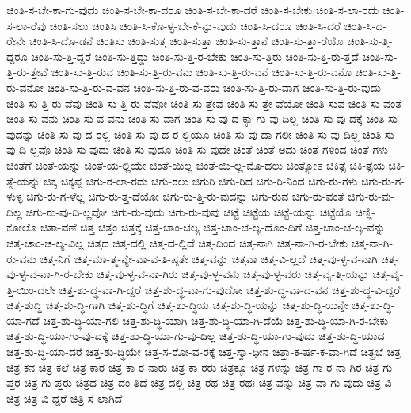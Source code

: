 {ಚಿಂತಿ-ಸ-ಬೇ-ಕಾ-ಗು-ವುದು
ಚಿಂತಿ-ಸ-ಬೇ-ಕಾ-ದರೂ
ಚಿಂತಿ-ಸ-ಬೇ-ಕಾ-ದರೆ
ಚಿಂತಿ-ಸ-ಬೇಕು
ಚಿಂತಿ-ಸ-ಲಾ-ರದು
ಚಿಂತಿ-ಸ-ಲಾ-ರೆವು
ಚಿಂತಿ-ಸಲು
ಚಿಂತಿಸಿ
ಚಿಂತಿ-ಸಿ-ಕೊ-ಳ್ಳ-ಬೇ-ಕೆ-ನ್ನು-ವುದು
ಚಿಂತಿ-ಸಿ-ದರೂ
ಚಿಂತಿ-ಸಿ-ದರೆ
ಚಿಂತಿ-ಸಿ-ದ-ರೇನೇ
ಚಿಂತಿ-ಸಿ-ದೊ-ಡನೆ
ಚಿಂತಿಸು
ಚಿಂತಿ-ಸುತ್ತ
ಚಿಂತಿ-ಸುತ್ತಾ
ಚಿಂತಿ-ಸು-ತ್ತಾನೆ
ಚಿಂತಿ-ಸು-ತ್ತಾ-ರೆಯೊ
ಚಿಂತಿ-ಸು-ತ್ತಿ-ದ್ದರೂ
ಚಿಂತಿ-ಸು-ತ್ತಿ-ದ್ದರೆ
ಚಿಂತಿ-ಸು-ತ್ತಿದ್ದು
ಚಿಂತಿ-ಸು-ತ್ತಿ-ರ-ಬೇಕು
ಚಿಂತಿ-ಸು-ತ್ತಿರು
ಚಿಂತಿ-ಸು-ತ್ತಿ-ರು-ತ್ತದೆ
ಚಿಂತಿ-ಸು-ತ್ತಿ-ರು-ತ್ತೇವೆ
ಚಿಂತಿ-ಸು-ತ್ತಿ-ರುವ
ಚಿಂತಿ-ಸು-ತ್ತಿ-ರು-ವನು
ಚಿಂತಿ-ಸು-ತ್ತಿ-ರು-ವನೆ
ಚಿಂತಿ-ಸು-ತ್ತಿ-ರು-ವನೊ
ಚಿಂತಿ-ಸು-ತ್ತಿ-ರು-ವನೋ
ಚಿಂತಿ-ಸು-ತ್ತಿ-ರು-ವ-ವನ
ಚಿಂತಿ-ಸು-ತ್ತಿ-ರು-ವ-ವರು
ಚಿಂತಿ-ಸು-ತ್ತಿ-ರು-ವಾಗ
ಚಿಂತಿ-ಸು-ತ್ತಿ-ರು-ವುದು
ಚಿಂತಿ-ಸು-ತ್ತಿ-ರು-ವೆವು
ಚಿಂತಿ-ಸು-ತ್ತಿ-ರು-ವೆವೋ
ಚಿಂತಿ-ಸು-ತ್ತೇವೆ
ಚಿಂತಿ-ಸು-ತ್ತೇ-ವೆಯೋ
ಚಿಂತಿ-ಸುವ
ಚಿಂತಿ-ಸು-ವಂತೆ
ಚಿಂತಿ-ಸು-ವನು
ಚಿಂತಿ-ಸು-ವ-ವನು
ಚಿಂತಿ-ಸು-ವಾಗ
ಚಿಂತಿ-ಸು-ವು-ದ-ಕ್ಕಾ-ಗು-ವು-ದಿಲ್ಲ
ಚಿಂತಿ-ಸು-ವು-ದಕ್ಕೆ
ಚಿಂತಿ-ಸು-ವುದನ್ನು
ಚಿಂತಿ-ಸು-ವು-ದ-ರಲ್ಲಿ
ಚಿಂತಿ-ಸು-ವು-ದ-ರ-ಲ್ಲಿಯೂ
ಚಿಂತಿ-ಸು-ವು-ದಾ-ಗಲೀ
ಚಿಂತಿ-ಸು-ವು-ದಿಲ್ಲ
ಚಿಂತಿ-ಸು-ವು-ದಿ-ಲ್ಲವೊ
ಚಿಂತಿ-ಸು-ವುದು
ಚಿಂತಿ-ಸು-ವುದೂ
ಚಿಂತಿ-ಸು-ವುದೇ
ಚಿಂತೆ
ಚಿಂತೆ-ಅದು
ಚಿಂತೆ-ಗಳಿಂದ
ಚಿಂತೆ-ಗಳು
ಚಿಂತೆಗೆ
ಚಿಂತೆ-ಯನ್ನು
ಚಿಂತೆ-ಯ-ಲ್ಲಿಯೇ
ಚಿಂತೆ-ಯಿಲ್ಲ
ಚಿಂತೆ-ಯಿ-ಲ್ಲ-ಮೊ-ದಲು
ಚಿಂತ್ಯೋಽ
ಚಿಕಿತ್ಸೆ
ಚಿಕಿ-ತ್ಸೆಯ
ಚಿಕಿ-ತ್ಸೆ-ಯನ್ನು
ಚಿಕ್ಕ
ಚಿಕ್ಕಪ್ಪ
ಚಿಗು-ರ-ಲಾ-ರದು
ಚಿಗು-ರಲು
ಚಿಗುರಿ
ಚಿಗು-ರಿದ
ಚಿಗು-ರಿ-ನಿಂದ
ಚಿಗು-ರು-ಗಳು
ಚಿಗು-ರು-ಗ-ಳುಳ್ಳ
ಚಿಗು-ರು-ಗ-ಳೆಲ್ಲ
ಚಿಗು-ರು-ತ್ತ-ದೆಯೋ
ಚಿಗು-ರು-ತ್ತಿ-ರು-ವುದನ್ನು
ಚಿಗು-ರುವ
ಚಿಗು-ರು-ವಂತೆ
ಚಿಗು-ರು-ವು-ದಿಲ್ಲ
ಚಿಗು-ರು-ವು-ದಿ-ಲ್ಲವೋ
ಚಿಗು-ರು-ವುದು
ಚಿಗು-ರು-ವುವು
ಚಿಟ್ಟೆ
ಚಿಟ್ಟೆಯ
ಚಿಟ್ಟೆ-ಯನ್ನು
ಚಿಟ್ಟೆಯೊ
ಚಿಣ್ಣಿ-ಕೋಲೊ
ಚಿತಾ-ವಣೆ
ಚಿತ್ತ
ಚಿತ್ತಂ
ಚಿತ್ತಕ್ಕೆ
ಚಿತ್ತ-ಚಾಂ-ಚಲ್ಯ
ಚಿತ್ತ-ಚಾಂ-ಚ-ಲ್ಯ-ದೊಂ-ದಿಗೆ
ಚಿತ್ತ-ಚಾಂ-ಚ-ಲ್ಯ-ವನ್ನು
ಚಿತ್ತ-ಚಾಂ-ಚ-ಲ್ಯ-ವಿಲ್ಲ
ಚಿತ್ತದ
ಚಿತ್ತ-ದಲ್ಲಿ
ಚಿತ್ತ-ದ-ಲ್ಲಿದೆ
ಚಿತ್ತ-ದಿಂದ
ಚಿತ್ತ-ನಾಗಿ
ಚಿತ್ತ-ನಾ-ಗಿ-ರ-ಬೇಕು
ಚಿತ್ತ-ನಾ-ಗಿ-ರು-ವನು
ಚಿತ್ತ-ನಿಗೆ
ಚಿತ್ತ-ಮಾ-ತ್ಮ-ನ್ಯೇ-ವಾ-ವ-ತಿ-ಷ್ಠತೇ
ಚಿತ್ತ-ವನ್ನು
ಚಿತ್ತವಾ
ಚಿತ್ತ-ವಿ-ಲ್ಲದೆ
ಚಿತ್ತ-ವು-ಳ್ಳ-ವ-ನಾಗಿ
ಚಿತ್ತ-ವು-ಳ್ಳ-ವ-ನಾ-ಗಿ-ರ-ಬೇಕು
ಚಿತ್ತ-ವು-ಳ್ಳ-ವ-ನಾ-ಗಿರು
ಚಿತ್ತ-ವು-ಳ್ಳ-ವನು
ಚಿತ್ತ-ವು-ಳ್ಳ-ವರು
ಚಿತ್ತ-ವೃ-ತ್ತಿ-ಯನ್ನು
ಚಿತ್ತ-ವೃ-ತ್ತಿ-ಯಿಂ-ದಲೇ
ಚಿತ್ತ-ಶು-ದ್ಧ-ವಾ-ಗಿ-ದ್ದರೆ
ಚಿತ್ತ-ಶು-ದ್ಧ-ವಾ-ಗು-ವುದೋ
ಚಿತ್ತ-ಶು-ದ್ಧ-ವಾ-ದ-ವನ
ಚಿತ್ತ-ಶು-ದ್ಧ-ವಿ-ದ್ದರೆ
ಚಿತ್ತ-ಶುದ್ಧಿ
ಚಿತ್ತ-ಶು-ದ್ಧಿ-ಗಾಗಿ
ಚಿತ್ತ-ಶು-ದ್ಧಿಗೆ
ಚಿತ್ತ-ಶು-ದ್ಧಿಯ
ಚಿತ್ತ-ಶು-ದ್ಧಿ-ಯನ್ನು
ಚಿತ್ತ-ಶು-ದ್ಧಿ-ಯನ್ನೇ
ಚಿತ್ತ-ಶು-ದ್ಧಿ-ಯಾ-ಗದೆ
ಚಿತ್ತ-ಶು-ದ್ಧಿ-ಯಾ-ಗಲಿ
ಚಿತ್ತ-ಶು-ದ್ಧಿ-ಯಾಗಿ
ಚಿತ್ತ-ಶು-ದ್ಧಿ-ಯಾ-ಗಿ-ದೆಯೆ
ಚಿತ್ತ-ಶು-ದ್ಧಿ-ಯಾ-ಗಿ-ರ-ಬೇಕು
ಚಿತ್ತ-ಶು-ದ್ಧಿ-ಯಾ-ಗು-ವು-ದಕ್ಕೆ
ಚಿತ್ತ-ಶು-ದ್ಧಿ-ಯಾ-ಗು-ವು-ದಿಲ್ಲ
ಚಿತ್ತ-ಶು-ದ್ಧಿ-ಯಾ-ಗು-ವುದು
ಚಿತ್ತ-ಶು-ದ್ಧಿ-ಯಾದ
ಚಿತ್ತ-ಶು-ದ್ಧಿ-ಯಾ-ದರೆ
ಚಿತ್ತ-ಶು-ದ್ಧಿಯೇ
ಚಿತ್ತ-ಸ-ರೋ-ವ-ರಕ್ಕೆ
ಚಿತ್ತ-ಸ್ವಾ-ಧೀನ
ಚಿತ್ತಾ-ಕ-ರ್ಷ-ಕ-ವಾ-ಗಿದೆ
ಚಿತ್ಪ್ರಭೆ
ಚಿತ್ರ
ಚಿತ್ರ-ಕನ
ಚಿತ್ರ-ಕಲೆ
ಚಿತ್ರ-ಕಾರ
ಚಿತ್ರ-ಕಾ-ರ-ನಾರು
ಚಿತ್ರ-ಕಾ-ರರು
ಚಿತ್ರಕ್ಕೂ
ಚಿತ್ರ-ಗಳನ್ನು
ಚಿತ್ರ-ಗಾ-ರ-ನಾ-ಗಿರ
ಚಿತ್ರ-ಗು-ಪ್ತರ
ಚಿತ್ರ-ಗು-ಪ್ತರು
ಚಿತ್ರದ
ಚಿತ್ರ-ದಂ-ತಿದೆ
ಚಿತ್ರ-ದಲ್ಲಿ
ಚಿತ್ರ-ರಥ
ಚಿತ್ರ-ರಥಃ
ಚಿತ್ರ-ವನ್ನು
ಚಿತ್ರ-ವಾ-ಗು-ವುದು
ಚಿತ್ರ-ವಿ-ಚಿತ್ರ
ಚಿತ್ರ-ವಿ-ದ್ದರೆ
ಚಿತ್ರಿ-ಸ-ಲಾಗಿದೆ
}
